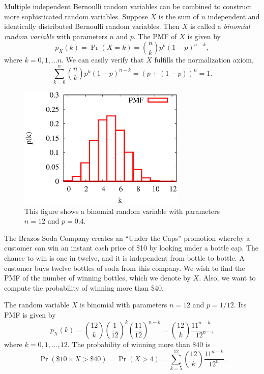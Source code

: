 Multiple independent Bernoulli random variables can be combined to construct more sophisticated random variables.
Suppose $X$ is the sum of $n$ independent and identically distributed Bernoulli random variables.
Then $X$ is called a \emph{binomial random variable} with parameters $n$ and $p$.
The PMF of $X$ is given by
\begin{equation*}
p_X (k) = \Pr (X = k)
= \binom{n}{k} p^k (1-p)^{n-k},
\end{equation*}
where $k = 0, 1, \ldots n$.
We can easily verify that $X$ fulfills the normalization axiom,
\begin{equation*}
\sum_{k=0}^n \binom{n}{k} p^k (1-p)^{n-k}
= \left( p + (1-p) \right)^n = 1.
\end{equation*}

\begin{figure}[ht]
\begin{center}
\includegraphics[width=8cm]{Figures/5chapter/binomial}
\end{center}
\caption{This figure shows a binomial random variable with parameters $n = 12$ and $p = 0.4$.}
\end{figure}

\begin{example} \label{BrazosSodaCompany1}
The Brazos Soda Company creates an ``Under the Caps'' promotion whereby a customer can win an instant cash price of \$10 by looking under a bottle cap.
The chance to win is one in twelve, and it is independent from bottle to bottle.
A customer buys twelve bottles of soda from this company.
We wish to find the PMF of the number of winning bottles, which we denote by $X$.
Also, we want to compute the probability of winning more than \$40.

The random variable $X$ is binomial with parameters $n = 12$ and $p = 1/12$.
Its PMF is given by
\begin{equation*}
p_X (k) = \binom{12}{k} \left( \frac{1}{12} \right)^k
\left( \frac{11}{12} \right)^{n-k}
= \binom{12}{k} \frac{11^{n-k}}{12^n} ,
\end{equation*}
where $k = 0, 1, \ldots, 12$.
The probability of winning more than \$40 is
\begin{equation*}
\Pr (\$10 \times X > \$40)
= \Pr (X > 4)
= \sum_{k=5}^{12} \binom{12}{k} \frac{11^{n-k}}{12^n} .
\end{equation*}
\end{example}


